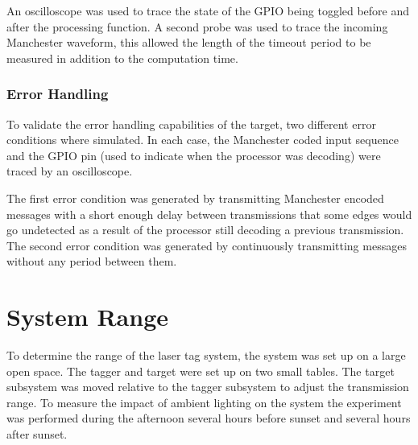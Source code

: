 An oscilloscope was used to trace the state of the GPIO being toggled before and after the processing function. A second probe was used to trace the incoming Manchester waveform, this allowed the length of the timeout period to be measured in addition to the computation time.

\subsubsection{Error Handling}
To validate the error handling capabilities of the target, two different error conditions where simulated. In each case, the Manchester coded input sequence and the GPIO pin (used to indicate when the processor was decoding) were traced by an oscilloscope.

The first error condition was generated by transmitting Manchester encoded messages with a short enough delay between transmissions that some edges would go undetected as a result of the processor still decoding a previous transmission. The second error condition was generated by continuously transmitting messages without any period between them.








\section{System Range}

To determine the range of the laser tag system, the system was set up on a large open space. The tagger and target were set up on two small tables. The target subsystem was moved relative to the tagger subsystem to adjust the transmission range. To measure the impact of ambient lighting on the system the experiment was performed during the afternoon several hours before sunset and several hours after sunset.

